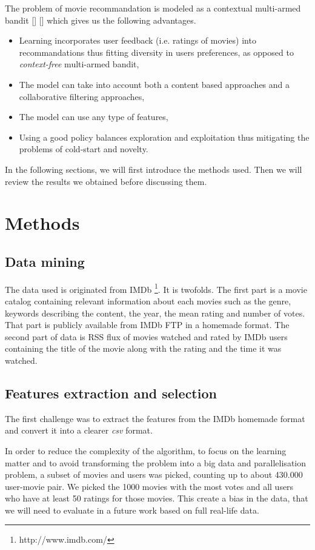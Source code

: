 \documentclass[letterpaper]{article}
\begin{document}
The problem of movie recommandation is modeled as a contextual multi-armed bandit [\cite{sutton1998reinforcement}] [\cite{lu2010contextual}] which gives us the following advantages.

\begin{itemize}
	\item Learning incorporates user feedback (i.e. ratings of movies) into recommandations thus fitting diversity in users preferences, as opposed to \textit{context-free} multi-armed bandit,
	\item The model can take into account both a content based approaches and a collaborative filtering approaches,
	\item The model can use any type of features,
	\item Using a good policy balances exploration and exploitation thus mitigating the problems of cold-start and novelty.
\end{itemize}


In the following sections, we will first introduce the methods used. Then we will review the results we obtained before discussing them.

\section{Methods}

\subsection{Data mining}

The data used is originated from IMDb \footnote{http://www.imdb.com/}. It is twofolds. The first part is a movie catalog containing relevant information about each movies such as the genre, keywords describing the content, the year, the mean rating and number of votes. That part is publicly available from IMDb FTP in a homemade format. The second part of data is RSS flux of movies watched and rated by IMDb users containing the title of the movie along with the rating and the time it was watched.

\subsection{Features extraction and selection}

The first challenge was to extract the features from the IMDb homemade format and convert it into a clearer \textit{csv} format.

In order to reduce the complexity of the algorithm, to focus on the learning matter and to avoid transforming the problem into a big data and parallelisation problem, a subset of movies and users was picked, counting up to about 430.000 user-movie pair. We picked the 1000 movies with the most votes and all users who have at least 50 ratings for those movies. This create a bias in the data, that we will need to evaluate in a future work based on full real-life data.
\end{document}
